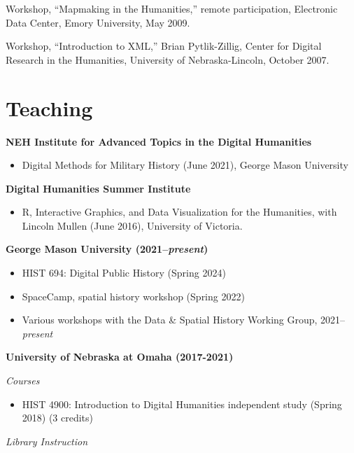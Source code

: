 Workshop, ``Mapmaking in the Humanities,'' remote participation,
Electronic Data Center, Emory University, May 2009.

Workshop, ``Introduction to XML,'' Brian Pytlik-Zillig, Center for
Digital Research in the Humanities, University of Nebraska-Lincoln,
October 2007.

\section{Teaching}\label{teaching}

\textbf{NEH Institute for Advanced Topics in the Digital Humanities}

\begin{itemize}
\tightlist
\item
  Digital Methods for Military History (June 2021), George Mason
  University
\end{itemize}

\textbf{Digital Humanities Summer Institute}

\begin{itemize}
\tightlist
\item
  R, Interactive Graphics, and Data Visualization for the Humanities,
  with Lincoln Mullen (June 2016), University of Victoria.
\end{itemize}

\textbf{George Mason University (2021--\emph{present})}

\begin{itemize}
\tightlist
\item
  HIST 694: Digital Public History (Spring 2024)
\item
  SpaceCamp, spatial history workshop (Spring 2022)
\item
  Various workshops with the Data \& Spatial History Working Group,
  2021--\emph{present}
\end{itemize}

\textbf{University of Nebraska at Omaha (2017-2021)}

\emph{Courses}

\begin{itemize}
\tightlist
\item
  HIST 4900: Introduction to Digital Humanities independent study
  (Spring 2018) (3 credits)
\end{itemize}

\emph{Library Instruction}

